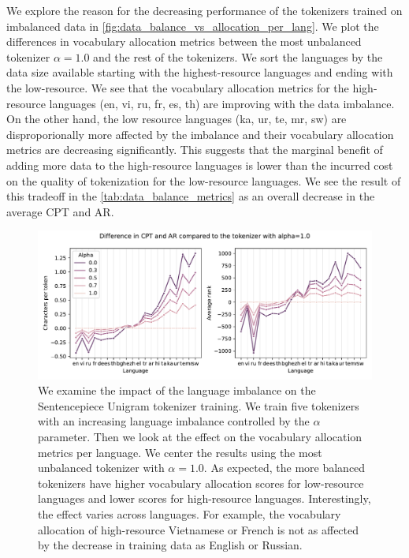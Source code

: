 We explore the reason for the decreasing performance of the tokenizers trained on imbalanced data in \autoref{fig:data_balance_vs_allocation_per_lang}. We plot the differences in vocabulary allocation metrics between the most unbalanced tokenizer $\alpha=1.0$ and the rest of the tokenizers. We sort the languages by the data size available starting with the highest-resource languages and ending with the low-resource. We see that the vocabulary allocation metrics for the high-resource languages (en, vi, ru, fr, es, th) are improving with the data imbalance. On the other hand, the low resource languages (ka, ur, te, mr, sw) are disproporionally more affected by the imbalance and their vocabulary allocation metrics are decreasing significantly. This suggests that the marginal benefit of adding more data to the high-resource languages is lower than the incurred cost on the quality of tokenization for the low-resource languages. We see the result of this tradeoff in the \autoref{tab:data_balance_metrics} as an overall decrease in the average CPT and AR.

\begin{figure}[H]
    \centering
    \includegraphics[width=\textwidth]{figures/ar_cpt_vs_alpha.pdf}
    \caption{We examine the impact of the language imbalance on the Sentencepiece Unigram tokenizer training. We train five tokenizers with an increasing language imbalance controlled by the $\alpha$ parameter. Then we look at the effect on the vocabulary allocation metrics per language. We center the results using the most unbalanced tokenizer with $\alpha=1.0$. As expected, the more balanced tokenizers have higher vocabulary allocation scores for low-resource languages and lower scores for high-resource languages. Interestingly, the effect varies across languages. For example, the vocabulary allocation of high-resource Vietnamese or French is not as affected by the decrease in training data as English or Russian.}
    \label{fig:data_balance_vs_allocation_per_lang}
\end{figure}


